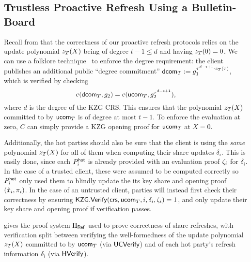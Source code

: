 \subsection{Trustless Proactive Refresh Using a Bulletin-Board}\label{sec:fs_protocol}

Recall from  that the correctness of our proactive refresh protocols relies on the update polynomial $z_{T}(X)$ being of degree $t-1 \leq d$ and having $z_{T}(0)=0$. 
We can use a folklore technique~\cite[\S2.5]{EC:CHMMVW20} 
to enforce the degree requirement: the client publishes an additional public ``degree commitment'' $\mathsf{dcom}_{T} := g_1^{\tau^{d-t+1} \cdot z_{T}(\tau)}$, %
which is verified by checking
\[
    e(\dcom_\timeT, g_2) = e(\ucom_\timeT, g_2^{\tau^{d-t+1}}), %
\]
where $d$ is the degree of the KZG CRS. This ensures that the polynomial $z_{T}(X)$ committed to by $\mathsf{ucom}_{T}$ is of degree at most $t-1$. To enforce the evaluation at zero, $C$ can simply provide a KZG opening proof for $\mathsf{ucom}_{T}$ at $X=0$.

Additionally, the hot parties should also be sure that the client is using the \emph{same} polynomial $z_{T}(X)$ for all of them when computing their share updates $\delta_i$. This is easily done, since each $P_i^{\mathsf{hot}}$ is already provided with an evaluation proof $\zeta_i$ for $\delta_i$. In the case of a trusted client, these were assumed to be computed correctly so $P_i^{\mathsf{hot}}$ only used them to blindly update the its key share and opening proof $(\tilde{x}_i, \pi_i)$. In the case of an untrusted client, parties will instead first check their correctness by ensuring $\mathsf{KZG}.{\mathsf{Verify}}(\mathsf{crs}, \mathsf{ucom}_{T}, i, \delta_i, \zeta_i) = 1$, and only update their key share and opening proof if verification passes.




 gives the proof system $\Pi_{\sf Ref}$ used to prove correctness of share refreshes, with verification split between verifying the well-formedness of the update polynomial $z_{T}(X)$ committed to by ${\sf u}\mathsf{com}_{T}$ (via ${\sf UC}{\mathsf{Verify}}$) and of each hot party's refresh information $\delta_i$ (via ${\sf H}{\mathsf{Verify}}$).

